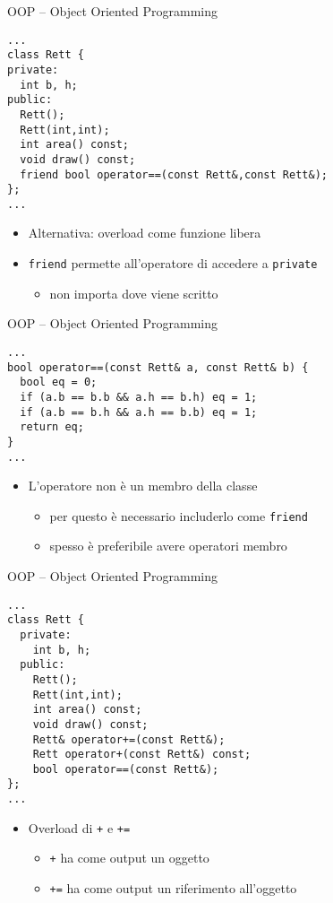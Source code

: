 \begin{frame}[fragile]{OOP -- Object Oriented Programming}
  \vfill
  \begin{lstlisting}[firstnumber=2]
...
class Rett {
private:
  int b, h;
public:
  Rett();
  Rett(int,int);
  int area() const;
  void draw() const;
  friend bool operator==(const Rett&,const Rett&);
};
...\end{lstlisting}
  \vfill
  \begin{itemize}
    \item Alternativa: overload come funzione \alert{libera}
    \vfill
    \item \lstinline$friend$ permette all'operatore di accedere a \lstinline$private$
    \begin{itemize}
      \item non importa dove viene scritto
    \end{itemize}
  \end{itemize}
  \vfill
\end{frame}

\begin{frame}[fragile]{OOP -- Object Oriented Programming}
  \vfill
  \begin{lstlisting}[firstnumber=37]
...
bool operator==(const Rett& a, const Rett& b) {
  bool eq = 0;
  if (a.b == b.b && a.h == b.h) eq = 1;
  if (a.b == b.h && a.h == b.b) eq = 1;
  return eq;
}
...\end{lstlisting}
  \vfill
  \begin{itemize}
    \item L'operatore \alert{non} è un membro della classe
    \begin{itemize}
      \item per questo è necessario includerlo come \lstinline$friend$
      \item spesso è preferibile avere operatori membro
    \end{itemize}
  \end{itemize}
  \vfill
\end{frame}

\begin{frame}[fragile]{OOP -- Object Oriented Programming}
  \vfill
  \begin{lstlisting}[firstnumber=2]
...
class Rett {
  private:
    int b, h;
  public:
    Rett();
    Rett(int,int);
    int area() const;
    void draw() const;
    Rett& operator+=(const Rett&);
    Rett operator+(const Rett&) const;
    bool operator==(const Rett&);
};
...\end{lstlisting}
  \vfill
  \begin{itemize}
    \item Overload di \lstinline$+$ e \lstinline$+=$
    \begin{itemize}
      \item \lstinline$+$ ha come output un oggetto
      \item \lstinline$+=$ ha come output un riferimento all'oggetto
    \end{itemize}
  \end{itemize}
  \vfill
\end{frame}

